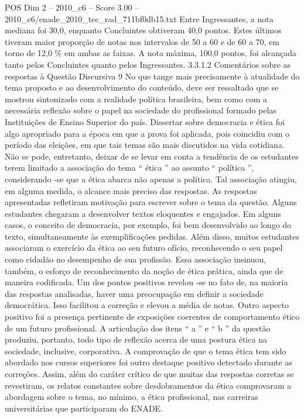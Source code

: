 \begin{textsample}{POS Dim 2 – 2010\_c6 – Score 3.00 – 2010\_c6/enade\_2010\_tec\_rad\_711bf0db15.txt}
Entre Ingressantes, a nota mediana foi 30,0, enquanto Concluintes obtiveram 40,0 pontos.
Estes últimos tiveram maior proporção de notas nos intervalos de 50 a 60 e de 60 a 70, em torno de 12,0 \% em ambas as faixas.
A nota máxima, 100,0 pontos, foi alcançada tanto pelos Concluintes quanto pelos Ingressantes. 3.3.1.2 Comentários sobre as respostas à Questão Discursiva 9 No que tange mais precisamente à atualidade do tema proposto e ao desenvolvimento do conteúdo, deve ser ressaltado que se mostrou sintonizado com a realidade política brasileira, bem como com a necessária reflexão sobre o papel na sociedade do profissional formado pelas Instituições de Ensino Superior do país.
Dissertar sobre democracia e ética foi algo apropriado para a época em que a prova foi aplicada, pois coincidiu com o período das eleições, em que tais temas são mais discutidos na vida cotidiana.
Não se pode, entretanto, deixar de se levar em conta a tendência de os estudantes terem limitado a associação do tema “ ética ” ao assunto “ política ”, considerando -se que a ética abarca não apenas a política.
Tal associação atingiu, em alguma medida, o alcance mais preciso das respostas.
As respostas apresentadas refletiram motivação para escrever sobre o tema da questão.
Alguns estudantes chegaram a desenvolver textos eloquentes e engajados.
Em alguns casos, o conceito de democracia, por exemplo, foi bem desenvolvido ao longo do texto, simultaneamente às exemplificações pedidas.
Além disso, muitos estudantes associaram o exercício da ética ao seu futuro ofício, reconhecendo o seu papel como cidadão no desempenho de sua profissão.
Essa associação insinuou, também, o esforço de reconhecimento da noção de ética prática, ainda que de maneira codificada.
Um dos pontos positivos revelou -se no fato de, na maioria das respostas analisadas, haver uma preocupação em definir a sociedade democrática.
Isso facilitou a correção e elevou a média de notas.
Outro aspecto positivo foi a presença pertinente de exposições coerentes de comportamento ético de um futuro profissional.
A articulação dos itens “ a ” e “ b ” da questão produziu, portanto, todo tipo de reflexão acerca de uma postura ética na sociedade, inclusive, corporativa.
A comprovação de que o tema ética tem sido abordado nos cursos superiores foi outro destaque positivo detectado durante as correções.
Assim, além do caráter crítico de que muitas das respostas corretas se revestiram, os relatos constantes sobre desdobramentos da ética comprovaram a abordagem sobre o tema, no mínimo, a ética profissional, nas carreiras universitárias que participaram do ENADE.

\end{textsample}
